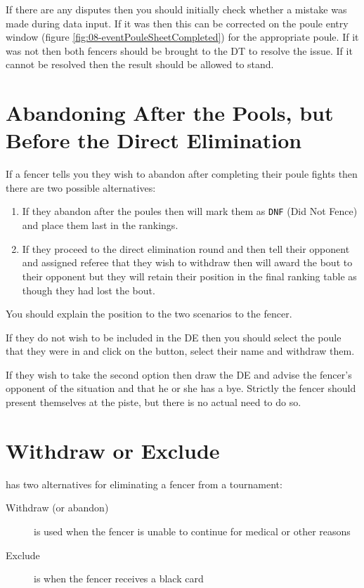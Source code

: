 \documentclass[a4paper,11pt]{memoir}
\begin{document}
If there are any disputes then you should initially check whether a mistake was made during data input. If it was then this can be corrected on the poule entry window (figure \ref{fig:08-eventPouleSheetCompleted}) for the appropriate poule. If it was not then both fencers should be brought to the DT to resolve the issue. If it cannot be resolved then the result should be allowed to stand.

\section{Abandoning After the Pools, but Before the Direct Elimination}

If a fencer tells you they wish to abandon after completing their poule fights then there are two possible alternatives:

\begin{enumerate}
 \item If they abandon after the poules then \fencingtime{} will mark them as \texttt{DNF} (Did Not Fence) and place them last in the rankings.
 \item If they proceed to the direct elimination round and then tell their opponent and assigned referee that they wish to withdraw then \fencingtime{} will award the bout to their opponent but they will retain their position in the final ranking table as though they had lost the bout.
\end{enumerate}

You should explain the position to the two scenarios to the fencer.

If they do not wish to be included in the DE then you should select the poule that they were in and click on the  button, select their name and withdraw them.

If they wish to take the second option then draw the DE and advise the fencer's opponent of the situation and that he or she has a bye. Strictly the fencer should present themselves at the piste, but there is no actual need to do so.

\section{Withdraw or Exclude}

\fencingtime{} has two alternatives for eliminating a fencer from a tournament:
\begin{description}
 \item[Withdraw (or abandon)] is used when the fencer is unable to continue for medical or other reasons
 \item[Exclude] is when the fencer receives a \gls{black card}
\end{description}
\end{document}
